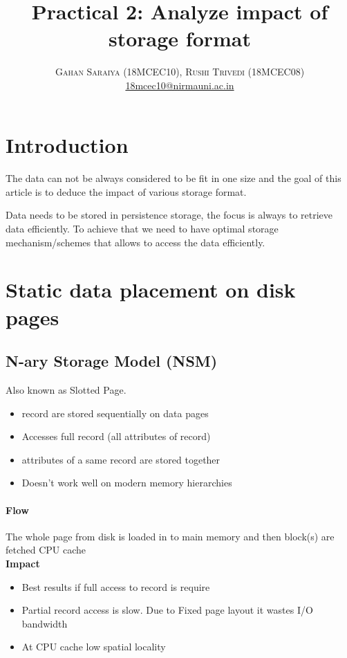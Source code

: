 \documentclass[paper=letter, fontsize=12pt]{article}
\title{\vspace{-15mm}\fontsize{24pt}{10pt}\selectfont\textbf{Practical 2: Analyze impact of storage format}} %
\author{
\large
{\textsc{Gahan Saraiya (18MCEC10), Rushi Trivedi (18MCEC08) }}\\[2mm]
\normalsize \href{mailto:18mcec10@nirmauni.ac.in}{18mcec10@nirmauni.ac.in}\\[2mm] %
}
\date{}
\begin{document}
\maketitle %
\thispagestyle{fancy} %

\newcommand*\tick{\item[\Checkmark]}
\newcommand*\arrow{\item[$\Rightarrow$]}
\newcommand*\fail{\item[\XSolidBrush]}

\section{Introduction}
\paragraph{}
The data can not be always considered to be fit in one size and the goal of this article is to deduce the impact of various storage format. 

Data needs to be stored in persistence storage, the focus is always to retrieve data efficiently.
To achieve that we need to have optimal storage mechanism/schemes that allows to access the data efficiently.   


\section{Static data placement on disk pages}
\subsection{N-ary Storage Model (NSM)}
	Also known as Slotted Page.
	\begin{itemize}
		\item record are stored sequentially on data pages
		\item Accesses full record (all attributes of record)
		\tick attributes of a same record are stored together
		\fail Doesn't work well on modern memory hierarchies
	\end{itemize}
	
	\paragraph{Flow}The whole page from disk is loaded in to main memory and then block(s) are fetched CPU cache
	\\
	\textbf{Impact}
	\begin{itemize}
		\tick Best results if full access to record is require
		\fail Partial record access is slow. Due to Fixed page layout it wastes I/O bandwidth
		\fail At CPU cache low spatial locality
	\end{itemize}
\end{document}
